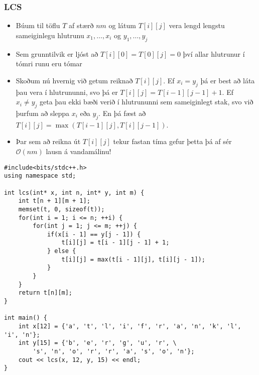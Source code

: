 \documentclass{beamer}
\begin{document}
\begin{frame}
\frametitle{LCS}

\begin{itemize}

\item<1-> Búum til töflu $T$ af stærð $nm$ og látum $T[i][j]$ vera lengd lengstu sameiginlegu hlutrunu $x_1,\dots,x_i$ og $y_1,\dots,y_j$

\item<2-> Sem grunntilvik er ljóst að $T[i][0] = T[0][j] = 0$ því allar hlutrunur í tómri runu eru tómar

\item<3-> Skoðum nú hvernig við getum reiknað $T[i][j]$. Ef $x_i = y_j$ þá er best að láta þau vera í hlutrununni, svo þá er $T[i][j] = T[i - 1][j - 1] + 1$. Ef $x_i \neq y_j$ geta þau ekki bæði verið í hlutrununni sem sameiginlegt stak, svo við þurfum að sleppa $x_i$ eða $y_j$. En þá fæst að $T[i][j] = \max(T[i - 1][j], T[i][j - 1])$.

\item<4-> Þar sem að reikna út $T[i][j]$ tekur fastan tíma gefur þetta þá af sér $\mathcal{O}(nm)$ lausn á vandamálinu!

\end{itemize}

\end{frame}

\begin{frame}[fragile]

\begin{scriptsize}
\begin{verbatim}
#include<bits/stdc++.h>
using namespace std;

int lcs(int* x, int n, int* y, int m) {
    int t[n + 1][m + 1];
    memset(t, 0, sizeof(t));
    for(int i = 1; i <= n; ++i) {
        for(int j = 1; j <= m; ++j) {
            if(x[i - 1] == y[j - 1]) {
                t[i][j] = t[i - 1][j - 1] + 1;
            } else {
                t[i][j] = max(t[i - 1][j], t[i][j - 1]);
            }
        }
    }
    return t[n][m];
}

int main() {
    int x[12] = {'a', 't', 'l', 'i', 'f', 'r', 'a', 'n', 'k', 'l', 'i', 'n'};
    int y[15] = {'b', 'e', 'r', 'g', 'u', 'r', \
        's', 'n', 'o', 'r', 'r', 'a', 's', 'o', 'n'};
    cout << lcs(x, 12, y, 15) << endl;
}
\end{verbatim}
\end{scriptsize}

\end{frame}
\end{document}
